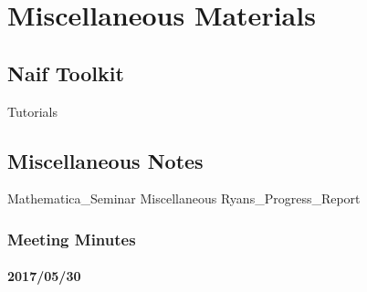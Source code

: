 \documentclass[crop=false,class=book]{standalone}
\begin{document}
\chapter{Miscellaneous Materials}
    \section{Naif Toolkit}
        {Tutorials}
    \section{Miscellaneous Notes}
        {Mathematica_Seminar}
        {Miscellaneous}
        {Ryans_Progress_Report}
    \subsection{Meeting Minutes}
        \subsubsection{2017/05/30}
\end{document}
